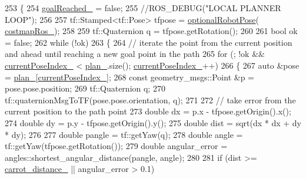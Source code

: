 \begin{DoxyCode}
253 \{
254     \hyperlink{classcl__move__base__z_1_1forward__local__planner_1_1ForwardLocalPlanner_a9d51ad6f0eb364ebd830526280bdf4fc}{goalReached\_} = \textcolor{keyword}{false};
255     \textcolor{comment}{//ROS\_DEBUG("LOCAL PLANNER LOOP");}
256 
257     tf::Stamped<tf::Pose> tfpose = \hyperlink{namespacecl__move__base__z_1_1forward__local__planner_a4c20f9fe0ca67779c53e90182baf4997}{optionalRobotPose}(
      \hyperlink{classcl__move__base__z_1_1forward__local__planner_1_1ForwardLocalPlanner_a37791fea67ce92c6e38e3727311e533b}{costmapRos\_});
258 
259     tf::Quaternion q = tfpose.getRotation();
260 
261     \textcolor{keywordtype}{bool} ok = \textcolor{keyword}{false};
262     \textcolor{keywordflow}{while} (!ok)
263     \{
264         \textcolor{comment}{// iterate the point from the current position and ahead until reaching a new goal point in the
       path}
265         \textcolor{keywordflow}{for} (; !ok && \hyperlink{classcl__move__base__z_1_1forward__local__planner_1_1ForwardLocalPlanner_af4019077a7661d10957cca16222547c2}{currentPoseIndex\_} < \hyperlink{classcl__move__base__z_1_1forward__local__planner_1_1ForwardLocalPlanner_a929e5d0a9db3027810beb658a2343560}{plan\_}.size(); 
      \hyperlink{classcl__move__base__z_1_1forward__local__planner_1_1ForwardLocalPlanner_af4019077a7661d10957cca16222547c2}{currentPoseIndex\_}++)
266         \{
267             \textcolor{keyword}{auto} &pose = \hyperlink{classcl__move__base__z_1_1forward__local__planner_1_1ForwardLocalPlanner_a929e5d0a9db3027810beb658a2343560}{plan\_}[\hyperlink{classcl__move__base__z_1_1forward__local__planner_1_1ForwardLocalPlanner_af4019077a7661d10957cca16222547c2}{currentPoseIndex\_}];
268             \textcolor{keyword}{const} geometry\_msgs::Point &p = pose.pose.position;
269             tf::Quaternion q;
270             tf::quaternionMsgToTF(pose.pose.orientation, q);
271 
272             \textcolor{comment}{// take error from the current position to the path point}
273             \textcolor{keywordtype}{double} dx = p.x - tfpose.getOrigin().x();
274             \textcolor{keywordtype}{double} dy = p.y - tfpose.getOrigin().y();
275             \textcolor{keywordtype}{double} dist = sqrt(dx * dx + dy * dy);
276 
277             \textcolor{keywordtype}{double} pangle = tf::getYaw(q);
278             \textcolor{keywordtype}{double} angle = tf::getYaw(tfpose.getRotation());
279             \textcolor{keywordtype}{double} angular\_error = angles::shortest\_angular\_distance(pangle, angle);
280 
281             \textcolor{keywordflow}{if} (dist >= \hyperlink{classcl__move__base__z_1_1forward__local__planner_1_1ForwardLocalPlanner_a4101afebb7e2a5eb0a2144a5fb553a92}{carrot\_distance\_} || angular\_error > 0.1)

\end{DoxyCode}
